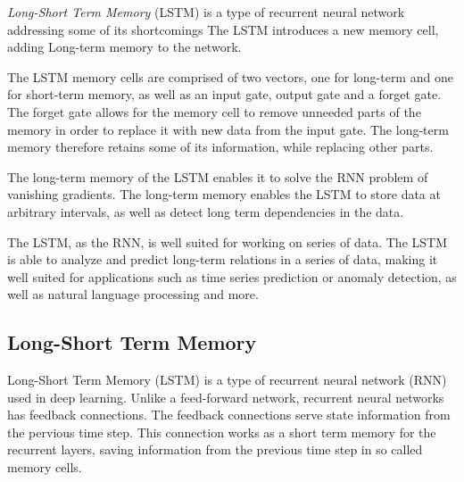 \textit{Long-Short Term Memory} (LSTM) is a type of recurrent neural network addressing some of its shortcomings
The LSTM introduces a new memory cell, adding Long-term memory to the network.

The LSTM memory cells are comprised of two vectors, one for long-term and one for short-term memory,
as well as an input gate, output gate and a forget gate.
The forget gate allows for the memory cell to remove unneeded parts of the memory in order to replace it with new data from the input gate.
The long-term memory therefore retains some of its information, while replacing other parts.

The long-term memory of the LSTM enables it to solve the RNN problem of vanishing gradients.
The long-term memory enables the LSTM to store data at arbitrary intervals, as well as detect long term dependencies in the data.

The LSTM, as the RNN, is well suited for working on series of data.
The LSTM is able to analyze and predict long-term relations in a series of data, making it well suited for applications such as time series prediction or anomaly detection,
as well as natural language processing and more.



\cite[p.~492-493]{Geron2017}





\iffalse
\subsection{Long-Short Term Memory}

Long-Short Term Memory (LSTM) is a type of recurrent neural network (RNN) used in deep learning.
Unlike a feed-forward network, recurrent neural networks has feedback connections.
The feedback connections serve state information from the pervious time step.
This connection works as a short term memory for the recurrent layers, saving information from the previous time step in so called memory cells.

